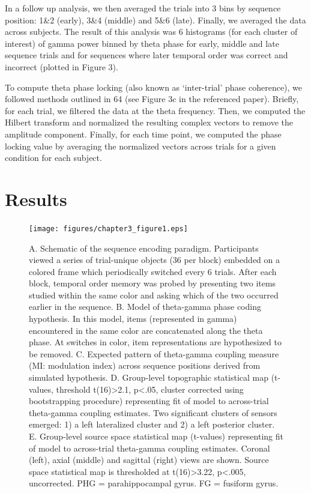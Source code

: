In a follow up analysis, we then averaged the trials into 3 bins by
sequence position: 1\&2 (early), 3\&4 (middle) and 5\&6 (late). Finally,
we averaged the data across subjects. The result of this analysis was 6
histograms (for each cluster of interest) of gamma power binned by theta
phase for early, middle and late sequence trials and for sequences where
later temporal order was correct and incorrect (plotted in Figure 3).

To compute theta phase locking (also known as `inter-trial' phase
coherence), we followed methods outlined in 64 (see Figure 3c in the
referenced paper). Briefly, for each trial, we filtered the data at the
theta frequency. Then, we computed the Hilbert transform and normalized
the resulting complex vectors to remove the amplitude component.
Finally, for each time point, we computed the phase locking value by
averaging the normalized vectors across trials for a given condition for
each subject.

\section{Results}\label{results}

\begin{figure}
  \centering
  \texttt{[image: figures/chapter3\_figure1.eps]}
  \caption[Theta-gamma coupling analysis and model fits.]{A. Schematic of the sequence encoding paradigm.  Participants viewed a series of trial-unique objects (36 per block) embedded on a colored frame which periodically switched every 6 trials.  After each block, temporal order memory was probed by presenting two items studied within the same color and asking which of the two occurred earlier in the sequence. B. Model of theta-gamma phase coding hypothesis. In this model, items (represented in gamma) encountered in the same color are concatenated along the theta phase.  At switches in color, item representations are hypothesized to be removed.  C. Expected pattern of theta-gamma coupling measure (MI: modulation index) across sequence positions derived from simulated hypothesis.  D. Group-level topographic statistical map (t-values, threshold t(16)>2.1, p<.05, cluster corrected using bootstrapping procedure) representing fit of model to across-trial theta-gamma coupling estimates. Two significant clusters of sensors emerged: 1) a left lateralized cluster and 2) a left posterior cluster. E. Group-level source space statistical map (t-values) representing fit of model to across-trial theta-gamma coupling estimates.  Coronal (left), axial (middle) and sagittal (right) views are shown.  Source space statistical map is thresholded at t(16)>3.22, p<.005, uncorrected. PHG = parahippocampal gyrus.  FG = fusiform gyrus.}
  \label{chapter3_figure1}
\end{figure}


